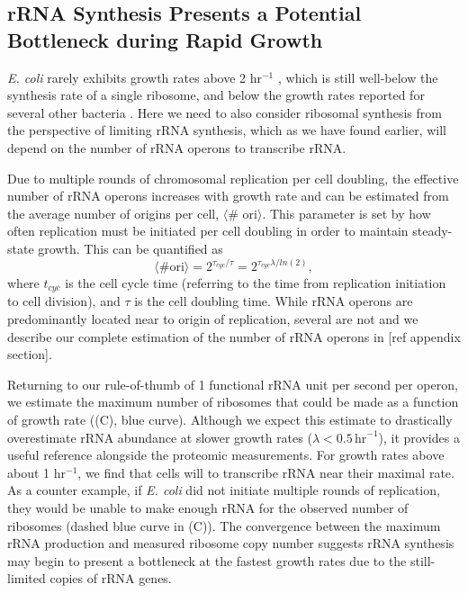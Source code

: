 \subsection{rRNA Synthesis Presents a Potential Bottleneck during Rapid Growth}
\textit{E. coli} rarely exhibits growth rates above 2 hr$^{-1}$
\citep{bremer2008}, which is still well-below the synthesis rate of a single
ribosome, and below the growth rates reported for several other bacteria
\citep{roller2016}. Here we need to also consider ribosomal synthesis from the
perspective of limiting rRNA synthesis, which as we have found earlier, will depend on the
number of rRNA operons to transcribe rRNA.

Due to multiple rounds of chromosomal replication per cell doubling, the
effective number of rRNA operons increases with growth rate and can be estimated
from the average number of origins per cell, $\langle$\# ori$\rangle$. This
parameter is set by how often replication must be initiated per cell doubling in
order to maintain steady-state growth. This can be quantified as
\begin{equation}
    \langle \text{\# ori} \rangle = 2^{\tau_{cyc} / \tau} = 2^{\tau_{cyc} \lambda / ln(2)},
    \label{eq:Nori}
\end{equation}
where $t_{cyc}$ is the cell cycle time (referring to the time from replication
initiation to cell division), and $\tau$ is the cell doubling time. While rRNA
operons are predominantly located near to origin of replication, several are not
and we describe our complete estimation of the number of rRNA operons in [ref
appendix section].

Returning to our rule-of-thumb of 1 functional rRNA unit per second per operon,
we estimate the maximum number of ribosomes that could be made as a function of
growth rate ((C), blue curve). Although we expect this
estimate to drastically overestimate rRNA abundance at slower growth rates
($\lambda < 0.5\, \text{hr}^{-1}$), it provides a useful reference alongside the
proteomic measurements. For growth rates above about 1 hr$^{-1}$, we find that
cells will  to transcribe rRNA near their maximal rate. As a counter
example, if \textit{E. coli} did not initiate multiple rounds of replication,
they would be unable to make enough rRNA for the observed number of ribosomes
(dashed blue curve in (C)). The convergence between the
maximum rRNA production and measured ribosome copy number suggests rRNA
synthesis may begin to present a bottleneck at the fastest growth rates due to
the still-limited copies of rRNA genes.


